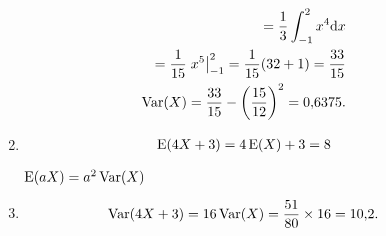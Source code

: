 \begin{description}
\begin{example}
\begin{enumerate}[label=(\alph*)]
\begin{align*}
                       =\frac{1}{3}\int_{-1}^{2} x^4 \mathrm{d}x\\
                       =\frac{1}{15}\left.x^5\right\rvert_{-1}^{2}
                       =\frac{1}{15}(32+1)=\frac{33}{15}\\
                       \operatorname{Var}(X)=\frac{33}{15}-\left(\frac{15}{12}\right)^2=0{,}6375.
                     \end{align*}
                   \item 
                     \begin{align*}
                       \operatorname{E}(4X+3)=4\operatorname{E}(X)+3
                       =8
                     \end{align*}
                     \begin{description}
                       \begin{obs}$\operatorname{E}(aX)= a^2 \operatorname{Var}(X)$\end{obs}
                   \end{description} 
                 \item 
                   \begin{align*}
                     \operatorname{Var}(4X+3) = 16 \operatorname{Var}(X)= \frac{51}{80}\times16= 10{,}2.
                   \end{align*}
               \end{enumerate}
       \end{example}     \end{description}
